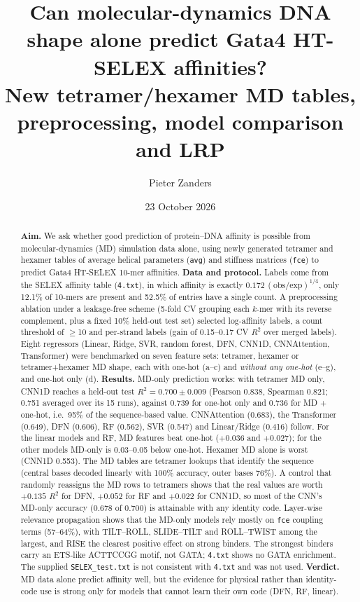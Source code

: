 \documentclass[11pt,a4paper]{article}
\title{Can molecular-dynamics DNA shape alone predict Gata4 HT-SELEX affinities?\\ New tetramer/hexamer MD tables, preprocessing, model comparison and LRP}
\author{Pieter Zanders}
\date{23 October 2026}
\begin{document}
\sloppy
\maketitle
\begin{abstract}
\textbf{Aim.} We ask whether good prediction of protein--DNA affinity is possible from molecular-dynamics (MD) simulation data alone, using newly generated tetramer and hexamer tables of average helical parameters (\texttt{avg}) and stiffness matrices (\texttt{fce}) to predict Gata4 HT-SELEX 10-mer affinities. \textbf{Data and protocol.} Labels come from the SELEX affinity table (\texttt{4.txt}), in which affinity is exactly $0.172\,(\mathrm{obs}/\mathrm{exp})^{1/4}$, only 12.1\% of 10-mers are present and 52.5\% of entries have a single count. A preprocessing ablation under a leakage-free scheme (5-fold CV grouping each $k$-mer with its reverse complement, plus a fixed 10\% held-out test set) selected log-affinity labels, a count threshold of $\geq$10 and per-strand labels (gain of 0.15--0.17 CV $R^2$ over merged labels). Eight regressors (Linear, Ridge, SVR, random forest, DFN, CNN1D, CNNAttention, Transformer) were benchmarked on seven feature sets: tetramer, hexamer or tetramer+hexamer MD shape, each with one-hot (a--c) and \emph{without any one-hot} (e--g), and one-hot only (d). \textbf{Results.} MD-only prediction works: with tetramer MD only, CNN1D reaches a held-out test $R^2=0.700\pm0.009$ (Pearson 0.838, Spearman 0.821; 0.751 averaged over its 15 runs), against 0.739 for one-hot only and 0.736 for MD + one-hot, i.e.\ 95\% of the sequence-based value. CNNAttention (0.683), the Transformer (0.649), DFN (0.606), RF (0.562), SVR (0.547) and Linear/Ridge (0.416) follow. For the linear models and RF, MD features beat one-hot ($+0.036$ and $+0.027$); for the other models MD-only is 0.03--0.05 below one-hot. Hexamer MD alone is worst (CNN1D 0.553). The MD tables are tetramer lookups that identify the sequence (central bases decoded linearly with 100\% accuracy, outer bases 76\%). A control that randomly reassigns the MD rows to tetramers shows that the real values are worth $+0.135$ $R^2$ for DFN, $+0.052$ for RF and $+0.022$ for CNN1D, so most of the CNN's MD-only accuracy (0.678 of 0.700) is attainable with any identity code. Layer-wise relevance propagation shows that the MD-only models rely mostly on \texttt{fce} coupling terms (57--64\%), with TILT--ROLL, SLIDE--TILT and ROLL--TWIST among the largest, and RISE the clearest positive effect on strong binders. The strongest binders carry an ETS-like ACTTCCGG motif, not GATA; \texttt{4.txt} shows no GATA enrichment. The supplied \texttt{SELEX\_test.txt} is not consistent with \texttt{4.txt} and was not used. \textbf{Verdict.} MD data alone predict affinity well, but the evidence for physical rather than identity-code use is strong only for models that cannot learn their own code (DFN, RF, linear).
\end{abstract}
\end{document}
